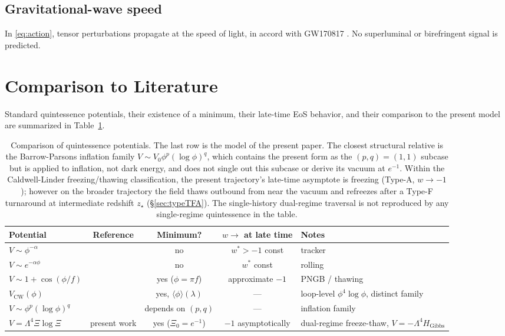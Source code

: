 \documentclass[11pt,reqno]{amsart}
\theoremstyle{plain}
\theoremstyle{definition}
\theoremstyle{remark}
\newcommand{\Gibbs}{\mathrm{Gibbs}}
\begin{document}
\subsection{Gravitational-wave speed}

In \eqref{eq:action}, tensor perturbations propagate at the speed of
light, in accord with GW170817 \cite{GW170817}. No superluminal or
birefringent signal is predicted.

\section{Comparison to Literature}\label{sec:comparison}

Standard quintessence potentials, their existence of a minimum, their
late-time EoS behavior, and their comparison to the present model are
summarized in Table~\ref{tab:compare}.

\begin{table}[h]
\small
\begin{tabular}{l|c|c|c|l}
Potential & Reference & Minimum? & $w \to$ at late time & Notes\\
\hline
$V \sim \phi^{-\alpha}$ & \cite{RatraPeebles1988} & no & $w^{*} > -1$ const & tracker\\
$V \sim e^{-\alpha\phi}$ & \cite{Wetterich1988} & no & $w^{*}$ const & rolling\\
$V \sim 1 + \cos(\phi/f)$ & \cite{Frieman1995} & yes ($\phi = \pi f$) & approximate $-1$ & PNGB / thawing\\
$V_\text{CW}(\phi)$ & \cite{ColemanWeinberg1973} & yes, $\langle\phi\rangle(\lambda)$ & --- & loop-level $\phi^{4}\log\phi$, distinct family\\
$V \sim \phi^{p}(\log\phi)^{q}$ & \cite{BarrowParsons1995} & depends on $(p,q)$ & --- & inflation family\\
$\boxed{V = \Lambda^{4}\Xi\log\Xi}$ & present work & yes ($\Xi_0 = e^{-1}$) & $-1$ asymptotically & dual-regime freeze-thaw, $V = -\Lambda^{4} H_{\Gibbs}$
\end{tabular}
\caption{Comparison of quintessence potentials. The last row is the
model of the present paper. The closest structural relative is the
Barrow-Parsons inflation family \cite{BarrowParsons1995}
$V \sim V_0 \phi^{p}(\log\phi)^{q}$, which contains the present form as
the $(p,q) = (1,1)$ subcase but is applied to inflation, not dark energy,
and does not single out this subcase or derive its vacuum at $e^{-1}$.
Within the Caldwell-Linder \cite{CaldwellLinder2005} freezing/thawing
classification, the present trajectory's late-time asymptote is
freezing (Type-A, $w \to -1$); however on the broader trajectory the
field thaws outbound from near the vacuum and refreezes after a
Type-F turnaround at intermediate redshift $z_\star$ (\S\ref{sec:typeTFA}).
The single-history dual-regime traversal is not reproduced by any
single-regime quintessence in the table.}
\label{tab:compare}
\end{table}
\end{document}

